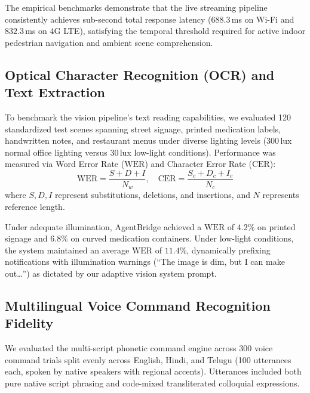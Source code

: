 \documentclass[10pt,a4paper]{article}
\begin{document}
The empirical benchmarks demonstrate that the live streaming pipeline consistently achieves sub-second total response latency ($688.3$\,ms on Wi-Fi and $832.3$\,ms on 4G LTE), satisfying the temporal threshold required for active indoor pedestrian navigation and ambient scene comprehension.

\subsection{Optical Character Recognition (OCR) and Text Extraction}
To benchmark the vision pipeline's text reading capabilities, we evaluated 120 standardized test scenes spanning street signage, printed medication labels, handwritten notes, and restaurant menus under diverse lighting levels (300\,lux normal office lighting versus 30\,lux low-light conditions). Performance was measured via Word Error Rate ($\text{WER}$) and Character Error Rate ($\text{CER}$):
\begin{equation}
    \text{WER} = \frac{S + D + I}{N_w}, \quad \text{CER} = \frac{S_c + D_c + I_c}{N_c}
\end{equation}
where $S, D, I$ represent substitutions, deletions, and insertions, and $N$ represents reference length.

Under adequate illumination, AgentBridge achieved a $\text{WER}$ of $4.2\%$ on printed signage and $6.8\%$ on curved medication containers. Under low-light conditions, the system maintained an average $\text{WER}$ of $11.4\%$, dynamically prefixing notifications with illumination warnings (``The image is dim, but I can make out\dots'') as dictated by our adaptive vision system prompt.

\subsection{Multilingual Voice Command Recognition Fidelity}
We evaluated the multi-script phonetic command engine across 300 voice command trials split evenly across English, Hindi, and Telugu (100 utterances each, spoken by native speakers with regional accents). Utterances included both pure native script phrasing and code-mixed transliterated colloquial expressions.
\end{document}
